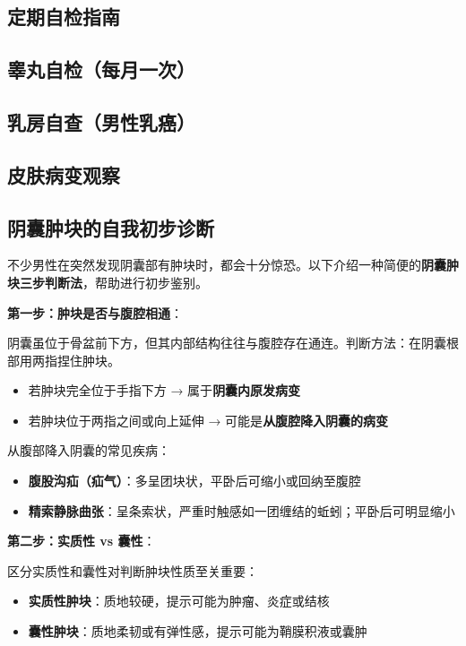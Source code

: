 \begin{enumerate}
\section{定期自检指南}
\subsection{睾丸自检（每月一次）}
\subsection{乳房自查（男性乳癌）}
\subsection{皮肤病变观察}
\subsection{阴囊肿块的自我初步诊断}

不少男性在突然发现阴囊部有肿块时，都会十分惊恐。以下介绍一种简便的\textbf{阴囊肿块三步判断法}，帮助进行初步鉴别。

\vspace{0.5em}
\noindent\textbf{第一步：肿块是否与腹腔相通}：

阴囊虽位于骨盆前下方，但其内部结构往往与腹腔存在通连。判断方法：在阴囊根部用两指捏住肿块。
\begin{itemize}
	\item 若肿块完全位于手指下方 → 属于\textbf{阴囊内原发病变}
	\item 若肿块位于两指之间或向上延伸 → 可能是\textbf{从腹腔降入阴囊的病变}
\end{itemize}

从腹部降入阴囊的常见疾病：
\begin{itemize}
	\item \textbf{腹股沟疝（疝气）}：多呈团块状，平卧后可缩小或回纳至腹腔
	\item \textbf{精索静脉曲张}：呈条索状，严重时触感如一团缠结的蚯蚓；平卧后可明显缩小
\end{itemize}

\vspace{0.5em}
\noindent\textbf{第二步：实质性 vs 囊性}：

区分实质性和囊性对判断肿块性质至关重要：
\begin{itemize}
	\item \textbf{实质性肿块}：质地较硬，提示可能为肿瘤、炎症或结核
	\item \textbf{囊性肿块}：质地柔韧或有弹性感，提示可能为鞘膜积液或囊肿
\end{itemize}


\end{enumerate}
